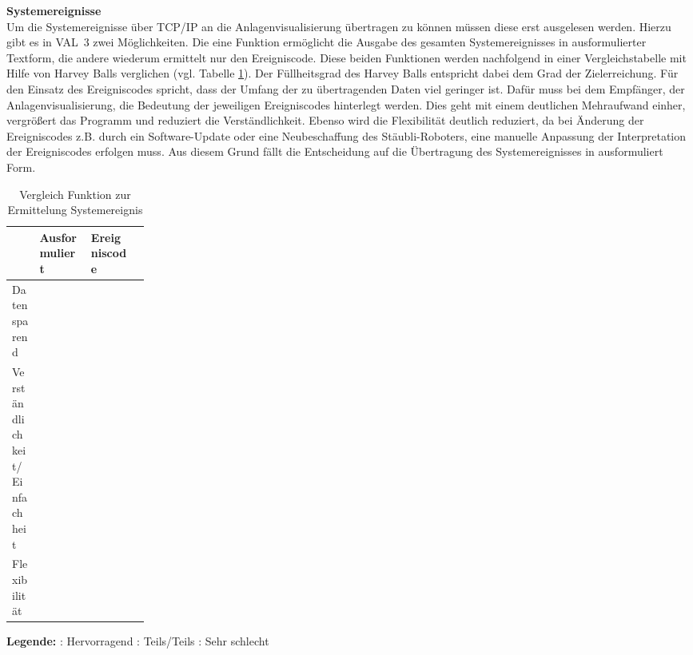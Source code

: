 \documentclass[ a4paper,
                oneside,
                toc=bibliography,
                toc=listof
                ]{scrbook}
\begin{document}
	\textbf{Systemereignisse}\\
	Um die Systemereignisse über TCP/IP an die Anlagenvisualisierung übertragen zu können müssen diese erst ausgelesen werden. Hierzu gibt es in VAL~3 zwei Möglichkeiten. Die eine Funktion ermöglicht die Ausgabe des gesamten Systemereignisses in ausformulierter Textform, die andere wiederum ermittelt nur den Ereigniscode. \cite{VAL3} Diese beiden Funktionen werden nachfolgend in einer Vergleichstabelle mit Hilfe von Harvey Balls verglichen (vgl. Tabelle \ref{tab:getEvent-vergleich}). Der Füllheitsgrad des Harvey Balls entspricht dabei dem Grad der Zielerreichung. Für den Einsatz des Ereigniscodes spricht, dass der Umfang der zu übertragenden Daten viel geringer ist. Dafür muss bei dem Empfänger, der Anlagenvisualisierung, die Bedeutung der jeweiligen Ereigniscodes hinterlegt werden. Dies geht mit einem deutlichen Mehraufwand einher, vergrößert das Programm und reduziert die Verständlichkeit. Ebenso wird die Flexibilität deutlich reduziert, da bei Änderung der Ereigniscodes z.B. durch ein Software-Update oder eine Neubeschaffung des Stäubli-Roboters, eine manuelle Anpassung der Interpretation der Ereigniscodes erfolgen muss. Aus diesem Grund fällt die Entscheidung auf die Übertragung des Systemereignisses in ausformuliert Form.\\
	\clearpage
	\begin{table}[!h]
		\centering
		\caption{Vergleich Funktion zur Ermittelung Systemereignis}
		\label{tab:getEvent-vergleich}
		\begin{tabularx}{\linewidth}{p{0.2\linewidth} >{\centering\arraybackslash}X >{\centering\arraybackslash}X >{\centering\arraybackslash}X}
			\hline
			\textbf{ } & \textbf{Ausformuliert} & \textbf{Ereigniscode}\\
			\hline
			Datensparend & \harveyBallQuarter& \harveyBallFull\\
			Verständlichkeit/Einfachheit & \harveyBallThreeQuarter & \harveyBallQuarter\\
			Flexibilität & \harveyBallThreeQuarter & \harveyBallQuarter \\
			\hline
		\end{tabularx}
		\begin{flushleft}
			\textbf{Legende:} \harveyBallFull: Hervorragend   \harveyBallHalf: Teils/Teils	\harveyBallNone: Sehr schlecht
		\end{flushleft}
	\end{table}
\end{document}

